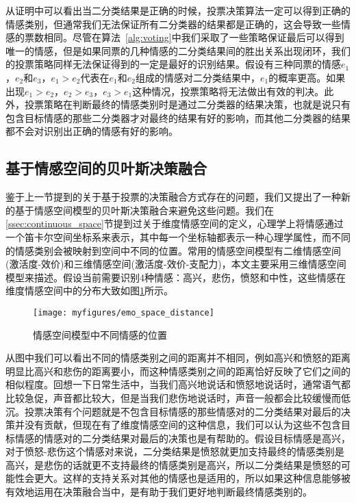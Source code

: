 从证明中可以看出当二分类结果是正确的时候，投票决策算法一定可以得到正确的情感类别，但通常我们无法保证所有二分类器的结果都是正确的，这会导致一些情感的票数相同。尽管在算法~\ref{alg:voting}中我们采取了一些策略保证最后可以得到唯一的情感，但是如果同票的几种情感的二分类结果间的胜出关系出现闭环，我们的投票策略同样无法保证得到的一定是最好的识别结果。假设有三种同票的情感$e_1$，$e_2$和$e_3$，$e_1>e_2$代表在$e_1$和$e_2$组成的情感对二分类结果中，$e_1$的概率更高。如果出现$e_1>e_2$，$e_2>e_3$，$e_3>e_1$这种情况，投票策略将无法做出有效的判决。此外，投票策略在判断最终的情感类别时是通过二分类器的结果决策，也就是说只有包含目标情感的那些二分类器才对最终的结果有好的影响，而其他二分类器的结果都不会对识别出正确的情感有好的影响。

\subsection{基于情感空间的贝叶斯决策融合}
\label{emo_space_decision_fusion}
鉴于上一节提到的关于基于投票的决策融合方式存在的问题，我们又提出了一种新的基于情感空间模型的贝叶斯决策融合来避免这些问题。我们在\ref{ssec:continuous_space}节提到过关于维度情感空间的定义，心理学上将情感通过一个笛卡尔空间坐标系来表示，其中每一个坐标轴都表示一种心理学属性，而不同的情感类别会被映射到空间中不同的位置。常用的情感空间模型有二维情感空间(激活度-效价)和三维情感空间(激活度-效价-支配力)，本文主要采用三维情感空间模型来描述。假设当前需要识别4种情感：高兴，悲伤，愤怒和中性，这些情感在维度情感空间中的分布大致如图\ref{fig:emo_space_distance}所示。

\begin{figure}[htb] %
    \centering
    \texttt{[image: myfigures/emo\_space\_distance]}
    \caption{情感空间模型中不同情感的位置}
    \label{fig:emo_space_distance}
\end{figure}

从图中我们可以看出不同的情感类别之间的距离并不相同，例如高兴和愤怒的距离明显比高兴和悲伤的距离要小，而这种情感类别之间的距离恰好反映了它们之间的相似程度。回想一下日常生活中，当我们高兴地说话和愤怒地说话时，通常语气都比较急促，声音都比较大，但是当我们悲伤地说话时，声音一般都会比较缓慢而低沉。投票决策有个问题就是不包含目标情感的那些情感对的二分类结果对最后的决策并没有贡献，但现在有了维度情感空间的这种信息，我们可以认为这些不包含目标情感的情感对的二分类结果对最后的决策也是有帮助的。假设目标情感是高兴，对于愤怒-悲伤这个情感对来说，二分类结果是愤怒就更加支持最终的情感类别是高兴，是悲伤的话就更不支持最终的情感类别是高兴，所以二分类结果是愤怒的可能性会更大。这样的支持关系对其他的情感也是适用的，所以如果这种信息能够被有效地运用在决策融合当中，是有助于我们更好地判断最终情感类别的。

